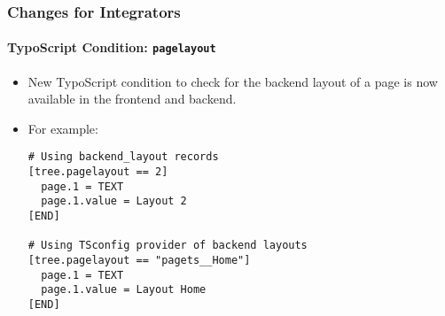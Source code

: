 %

\begin{frame}[fragile]
	\frametitle{Changes for Integrators}
	\framesubtitle{TypoScript Condition: \texttt{pagelayout}}


	\begin{itemize}
		\item New TypoScript condition to check for the backend layout of a page
			is now available in the frontend and backend.
		\item For example:
\begin{lstlisting}
# Using backend_layout records
[tree.pagelayout == 2]
  page.1 = TEXT
  page.1.value = Layout 2
[END]

# Using TSconfig provider of backend layouts
[tree.pagelayout == "pagets__Home"]
  page.1 = TEXT
  page.1.value = Layout Home
[END]
\end{lstlisting}

	\end{itemize}
\end{frame}

